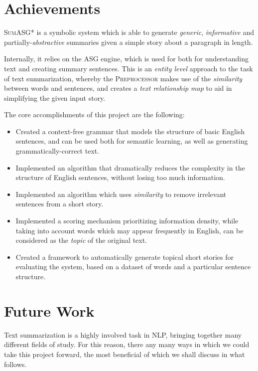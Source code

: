\section{Achievements}

\textsc{SumASG*} is a symbolic system which is able to generate \textit{generic}, \textit{informative} and partially-\textit{abstractive} summaries given a simple story about a paragraph in length.

Internally, it relies on the ASG engine, which is used for both for understanding text and creating summary sentences. This is an \textit{entity level} approach to the task of text summarization, whereby the \textsc{Preprocessor} makes use of the \textit{similarity} between words and sentences, and creates a \textit{text relationship map} to aid in simplifying the given input story.

The core accomplishments of this project are the following:

\begin{itemize}
\item Created a context-free grammar that models the structure of basic English sentences, and can be used both for semantic learning, as well as generating grammatically-correct text.
\item Implemented an algorithm that dramatically reduces the complexity in the structure of English sentences, without losing too much information.
\item Implemented an algorithm which uses \textit{similarity} to remove irrelevant sentences from a short story.
\item Implemented a scoring mechanism prioritizing information density, while taking into account words which may appear frequently in English, can be considered as the \textit{topic} of the original text.
\item Created a framework to automatically generate topical short stories for evaluating the system, based on a dataset of words and a particular sentence structure.
\end{itemize}

\section{Future Work}

Text summarization is a highly involved task in NLP, bringing together many different fields of study. For this reason, there any many ways in which we could take this project forward, the most beneficial of which we shall discuss in what follows.

